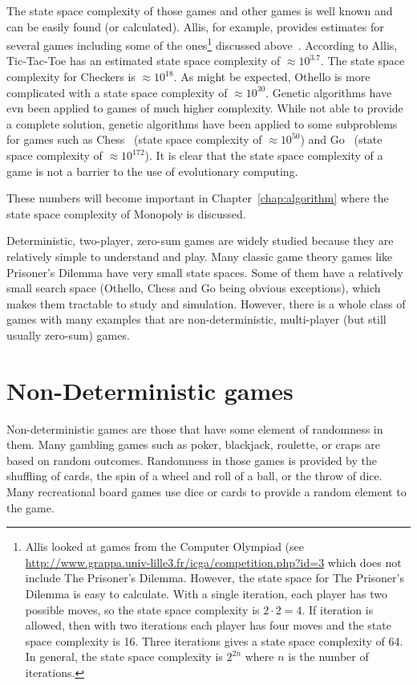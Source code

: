 The state space complexity of those games and other games is well known and can
be easily found (or calculated). Allis, for example, provides estimates for
several games including some of the ones\footnote{Allis looked at games from the
Computer Olympiad (see
\url{http://www.grappa.univ-lille3.fr/icga/competition.php?id=3} which does not
include The Prisoner's Dilemma. However, the state space for The Prisoner's
Dilemma is easy to calculate. With a single iteration, each player has two
possible moves, so the state space complexity is \(2\cdot2=4\). If iteration is
allowed, then with two iterations each player has four moves and the state space
complexity is 16. Three iterations gives a state space complexity of 64. In
general, the state space complexity is \(2^{2n}\) where \(n\) is the number of
iterations.} discussed above~\cite{Allis1994}. According to Allis, Tic-Tac-Toe
has an estimated state space complexity of \(\approx10^{3.7}\). The state space
complexity for Checkers is \(\approx10^{18}\). As might be expected, Othello is
more complicated with a state space complexity of \(\approx10^{30}\). Genetic
algorithms have evn been applied to games of much higher complexity. While not
able to provide a complete solution, genetic algorithms have been applied to
some subproblems for games such as Chess~\cite{Mitsuta:2010:OPG:1994486.1994517}
(state space complexity of \(\approx10^{50}\)) and
Go~\cite{shah2012Go,Blackman2009Go} (state space complexity of
\(\approx10^{172}\)). It is clear that the state space complexity of a game is
not a barrier to the use of evolutionary computing.

These numbers will become important in Chapter~\ref{chap:algorithm} where the
state space complexity of Monopoly is discussed.

Deterministic, two-player, zero-sum games are widely studied because they are
relatively simple to understand and play. Many classic game theory games like
Prisoner's Dilemma have very small state spaces. Some of them have a relatively
small search space (Othello, Chess and Go being obvious exceptions), which makes
them tractable to study and simulation. However, there is a whole class of games
with many examples that are non-deterministic, multi-player (but still usually
zero-sum) games.

\section{Non-Deterministic games}

Non-deterministic games are those that have some element of randomness in them.
Many gambling games such as poker, blackjack, roulette, or craps are based on
random outcomes. Randomness in those games is provided by the shuffling of
cards, the spin of a wheel and roll of a ball, or the throw of dice. Many
recreational board games use dice or cards to provide a random element to the
game.

